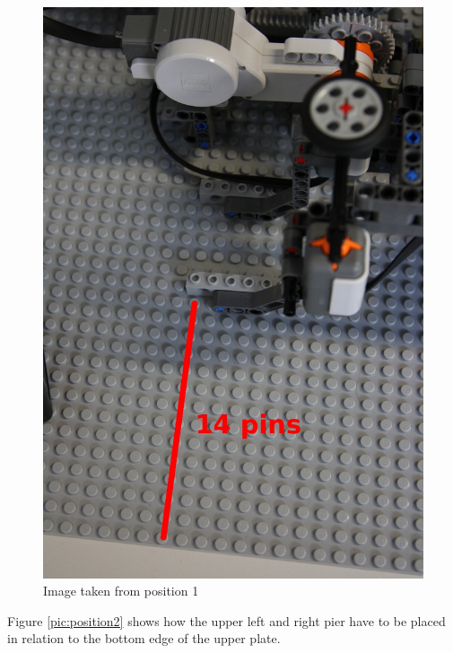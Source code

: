 \documentclass[%
  a4paper,%
  11pt,%
  blue,%
  hyperref	%
  ]{tubsartcl}
\begin{document}
\begin{figure}[!htb]
\begin{center}
\includegraphics[scale=0.35]{graphics_lego/position1.jpg}
\end{center}
\caption{Image taken from position 1}
\label{pic:position1}
\end{figure}

\newpage

Figure \ref{pic:position2} shows how the upper left and right pier have to be placed in relation to the bottom edge of the upper plate.
\end{document}
